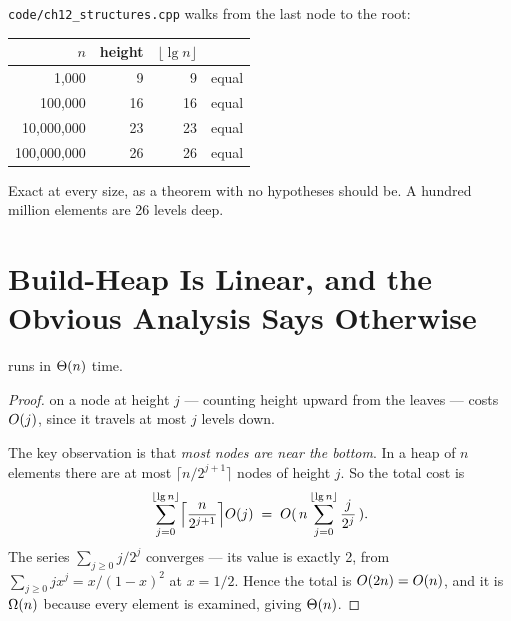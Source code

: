 \begin{worked}
\texttt{code/ch12\_structures.cpp} walks from the last node to the root:

\begin{center}
\begin{tabular}{@{}rrrl@{}}
\toprule
\rowcolor{primary!15}
$n$ & height & $\lfloor \lg n \rfloor$ & \\
\midrule
      1{,}000 &  9 &  9 & equal \\
    100{,}000 & 16 & 16 & equal \\
 10{,}000{,}000 & 23 & 23 & equal \\
100{,}000{,}000 & 26 & 26 & equal \\
\bottomrule
\end{tabular}
\end{center}

\smallskip
Exact at every size, as a theorem with no hypotheses should be. A hundred
million elements are 26 levels deep.
\end{worked}

\section{Build-Heap Is Linear, and the Obvious Analysis Says Otherwise}


\begin{theorem}\label{thm:buildheap}
 runs in $\Theta(n)$ time.
\end{theorem}

\begin{proof}
 on a node at height $j$ --- counting height upward from the
leaves --- costs $O(j)$, since it travels at most $j$ levels down.

\smallskip
The key observation is that \emph{most nodes are near the bottom}. In a heap of
$n$ elements there are at most $\lceil n/2^{j+1} \rceil$ nodes of height $j$.
So the total cost is
\[ \sum_{j=0}^{\lfloor \operatorname{lg} n \rfloor} \Bigl\lceil \frac{n}{2^{j+1}} \Bigr\rceil
   O(j)
   \;=\; O(\,n \sum_{j=0}^{\lfloor \operatorname{lg} n \rfloor} \frac{j}{2^{j}}\,). \]
The series $\sum_{j\ge0} j/2^{j}$ converges --- its value is exactly 2, from
$\sum_{j\ge0} jx^{j} = x/(1-x)^{2}$ at $x = 1/2$. Hence the total is
$O(2n) = O(n)$, and it is $\Omega(n)$ because every element is
examined, giving $\Theta(n)$.
\end{proof}

